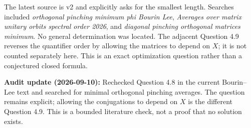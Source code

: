 \documentclass[11pt,a4paper]{article}
\begin{document}
The latest source is v2 and explicitly asks for the smallest length.
Searches included
\textit{orthogonal pinching minimum phi Bourin Lee},
\textit{Averages over matrix unitary orbits spectral order 2026},
and \textit{diagonal pinching orthogonal matrices minimum}. No
general determination was located. The adjacent Question 4.9 reverses
the quantifier order by allowing the matrices to depend on \(X\); it is
not counted separately here. This is an exact optimization question
rather than a conjectured closed formula.

\textbf{Audit update (2026-09-10):} Rechecked Question 4.8 in the
current Bourin--Lee text and searched for minimal orthogonal pinching
averages. The question remains explicit; allowing the conjugations to
depend on \(X\) is the different Question 4.9. This is a bounded
literature check, not a proof that no solution exists.
\end{document}
